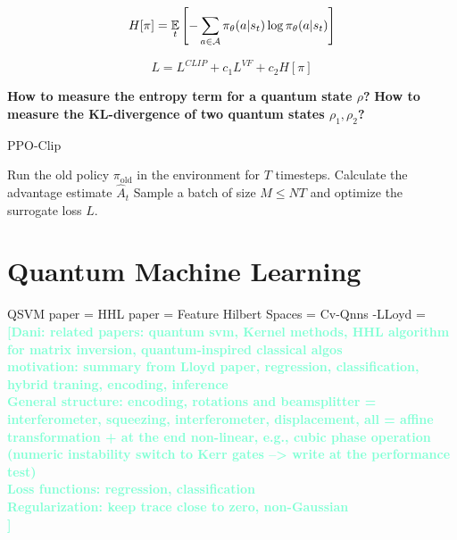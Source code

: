 \documentclass[12pt, a4paper,  nobibnotes]{article}
\newcommand{\nd}[1]{\textcolor{Aquamarine}{\textbf{[Dani: #1]}}}
\begin{document}
\begin{equation}
H[\pi] = \underset{t}{\LARGE{\mathbb E}}\left[
-\sum\limits_{a\in \mathcal A}\pi_{\theta}(a|s_t)\log\pi_{\theta}(a|s_t)
\right]
\end{equation}

\begin{equation}
L = L^{CLIP} + c_1L^{VF} + c_2 H[\pi]
\end{equation}

\textbf{How to measure the entropy term for a quantum state $\rho$?}
\textbf{How to measure the KL-divergence of two quantum states $\rho_1,\rho_2$?}
\begin{algorithm}[H]
    \caption{PPO-Clip}
    \begin{algorithmic}[1]
                \State Run the old policy $\pi_{\textrm{old}}$ in the environment for $T$ timesteps.
                    \State Calculate the advantage estimate $\hat A_t$
                \EndFor
            \EndFor
                \State Sample a batch of size $M\leq NT$ and optimize the surrogate loss $L$.
            \EndFor
        \EndFor
    \EndProcedure
    \end{algorithmic}
\end{algorithm}

\section{Quantum Machine Learning}
QSVM paper = \cite{QSVMPaper}
HHL paper = \cite{HHLPaper}
Feature Hilbert Spaces = \cite{FeatureHilbertSpaces}
Cv-Qnns -LLoyd = \cite{CVQNNLLoyd}
\nd{related papers: quantum svm, Kernel methods, HHL algorithm for matrix inversion, quantum-inspired classical algos\\
motivation: summary from Lloyd paper, regression, classification, hybrid traning, encoding, inference\\
General structure: encoding, rotations and beamsplitter = interferometer, squeezing, interferometer, displacement, all = affine transformation + at the end non-linear, e.g., cubic phase operation (numeric instability switch to Kerr gates --> write at the performance test)  \\
Loss functions: regression, classification\\
Regularization: keep trace close to zero, non-Gaussian\\
}
\end{document}
